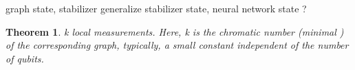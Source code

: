 \documentclass[
aps,
pra,
floatfix,
]{revtex4-2}
\theoremstyle{plain}
\newtheorem{theorem}{Theorem}
\newtheorem{proposition}{Proposition}
\theoremstyle{definition}
\newcommand{\ew}{\hat{W}}
\newcommand{\dm}{\rho}
\begin{document}
graph state, stabilizer \cite{zhouDetectingMultipartiteEntanglement2019}
generalize \cite{zhangEfficientEntanglementGeneration2021}
stabilizer state, neural network state \cite{gaoEfficientRepresentationQuantum2017}?

\begin{theorem}
	k local measurements. Here, k is the chromatic number (minimal ) of the corresponding graph, typically, a small constant independent of the number of qubits.
\end{theorem}
\end{document}
